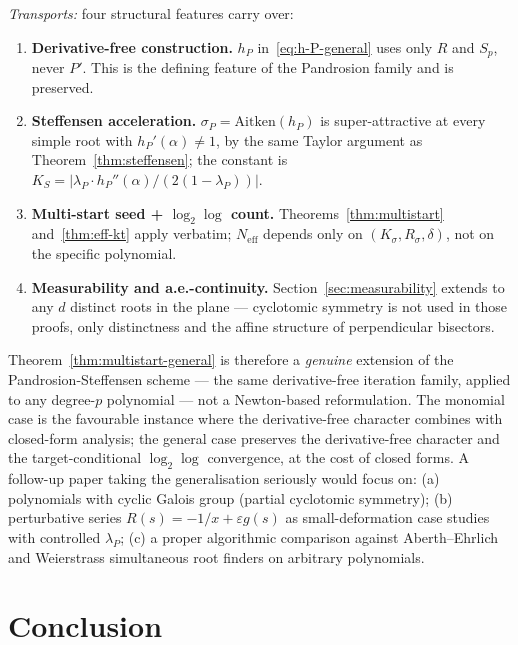 \documentclass[11pt,a4paper]{article}
\theoremstyle{definition}
\begin{document}
\emph{Transports:} four structural features carry over:
\begin{enumerate}
  \item \textbf{Derivative-free construction.} $h_P$ in~\eqref{eq:h-P-general} uses only $R$ and $S_p$, never $P'$. This is the defining feature of the Pandrosion family and is preserved.
  \item \textbf{Steffensen acceleration.} $\sigma_P = \mathrm{Aitken}(h_P)$ is super-attractive at every simple root with $h_P'(\alpha) \neq 1$, by the same Taylor argument as Theorem~\ref{thm:steffensen}; the constant is $K_S = |\lambda_P \cdot h_P''(\alpha)/(2(1 - \lambda_P))|$.
  \item \textbf{Multi-start seed + $\log_2\log$ count.} Theorems~\ref{thm:multistart} and~\ref{thm:eff-kt} apply verbatim; $N_{\mathrm{eff}}$ depends only on $(K_\sigma, R_\sigma, \delta)$, not on the specific polynomial.
  \item \textbf{Measurability and a.e.-continuity.} Section~\ref{sec:measurability} extends to any $d$ distinct roots in the plane --- cyclotomic symmetry is not used in those proofs, only distinctness and the affine structure of perpendicular bisectors.
\end{enumerate}

Theorem~\ref{thm:multistart-general} is therefore a \emph{genuine} extension of the Pandrosion-Steffensen scheme --- the same derivative-free iteration family, applied to any degree-$p$ polynomial --- not a Newton-based reformulation. The monomial case is the favourable instance where the derivative-free character combines with closed-form analysis; the general case preserves the derivative-free character and the target-conditional $\log_2\log$ convergence, at the cost of closed forms. A follow-up paper taking the generalisation seriously would focus on: (a) polynomials with cyclic Galois group (partial cyclotomic symmetry); (b) perturbative series $R(s) = -1/x + \varepsilon g(s)$ as small-deformation case studies with controlled $\lambda_P$; (c) a proper algorithmic comparison against Aberth--Ehrlich and Weierstrass simultaneous root finders on arbitrary polynomials.

\section{Conclusion}
\label{sec:conclusion}
\end{document}
